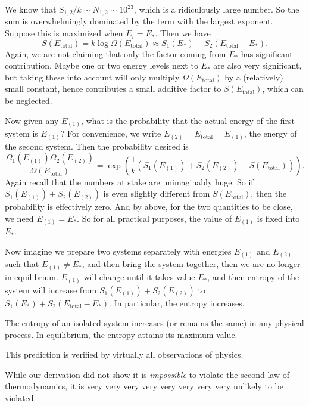 \documentclass[a4paper]{article}
\begin{document}
We know that $S_{1, 2}/k \sim N_{1, 2} \sim 10^{23}$, which is a ridiculously large number. So the sum is overwhelmingly dominated by the term with the largest exponent. Suppose this is maximized when $E_i = E_*$. Then we have
\[
  S(E_{\mathrm{total}}) = k \log \Omega(E_{\mathrm{total}}) \approx S_1(E_*) + S_2(E_{\mathrm{total}} - E_*).
\]
Again, we are not claiming that only the factor coming from $E_*$ has significant contribution. Maybe one or two energy levels next to $E_*$ are also very significant, but taking these into account will only multiply $\Omega(E_{\mathrm{total}})$ by a (relatively) small constant, hence contributes a small additive factor to $S(E_{\mathrm{total}})$, which can be neglected.

Now given any $E_{(1)}$, what is the probability that the actual energy of the first system is $E_{(1)}$? For convenience, we write $E_{(2)} = E_{\mathrm{total}} = E_{(1)}$, the energy of the second system. Then the probability desired is
\[
  \frac{\Omega_1(E_{(1)})\Omega_2(E_{(2)})}{\Omega(E_{\mathrm{total}})} = \exp\left(\frac{1}{k}\left(S_1(E_{(1)}) + S_2(E_{(2)}) - S(E_{\mathrm{total}})\right)\right).
\]
Again recall that the numbers at stake are unimaginably huge. So if $S_1(E_{(1)}) + S_2(E_{(2)})$ is even slightly different from $S(E_{\mathrm{total}})$, then the probability is effectively zero. And by above, for the two quantities to be close, we need $E_{(1)} = E_*$. So for all practical purposes, the value of $E_{(1)}$ is fixed into $E_*$.

Now imagine we prepare two systems separately with energies $E_{(1)}$ and $E_{(2)}$ such that $E_{(1)} \not= E_*$, and then bring the system together, then we are no longer in equilibrium. $E_{(1)}$ will change until it takes value $E_*$, and then entropy of the system will increase from $S_1(E_{(1)}) + S_2(E_{(2)})$ to $S_1(E_*) + S_2(E_{\mathrm{total}} - E_*)$. In particular, the entropy increases.
\begin{law}
  The entropy of an isolated system increases (or remains the same) in any physical process. In equilibrium, the entropy attains its maximum value.
\end{law}
This prediction is verified by virtually all observations of physics.

While our derivation did not show it is \emph{impossible} to violate the second law of thermodynamics, it is very very very very very very very very unlikely to be violated.
\end{document}
